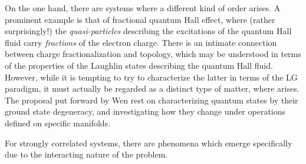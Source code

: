 On the one hand, there are systems where a different kind of order arises.
A prominent example is that of fractional quantum Hall effect, where (rather surprisingly!) the \emph{quasi-particles} describing the excitations of the quantum Hall fluid carry \emph{fractions} of the electron charge.
There is an intimate connection between charge fractionalization and topology, which may be understood in terms of the properties of the Laughlin states describing the quantum Hall fluid. However, while it is tempting to try to characterize the latter in terms of the LG paradigm, it must actually be regarded as a distinct type of matter, where  arises.
The proposal put forward by Wen rest on characterizing quantum states by their ground state degeneracy, and investigating how they change under operations defined on specific manifolds.

For strongly correlated systems, there are phenomena which emerge specifically due to the interacting nature of the problem.